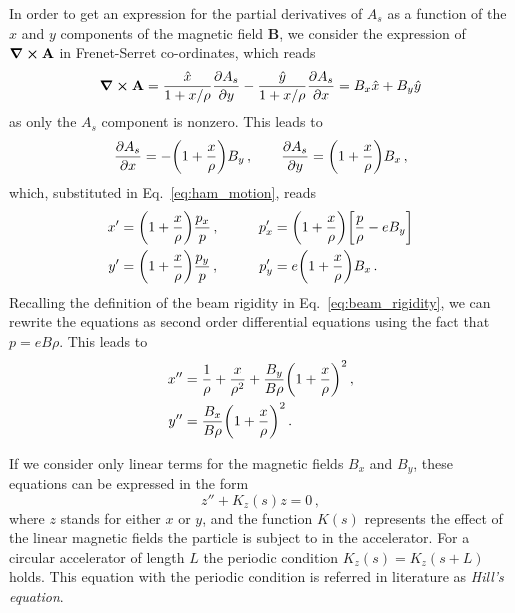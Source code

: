 In order to get an expression for the partial derivatives of $A_s$ as a function of the $x$ and $y$ components of the magnetic field $\mathbf{B}$, we consider the expression of $\curl \mathbf{A}$ in Frenet-Serret co-ordinates, which reads
%
\begin{equation}
    \curl \mathbf{A} = \frac{\hat x}{1+x/\rho}\pdv{A_s}{y} - \frac{\hat y}{1+x/\rho}\pdv{A_s}{x} = B_x\hat x + B_y\hat y %
\end{equation}
%
as only the $A_s$ component is nonzero. This leads to
%
\begin{equation}
    \pdv{A_s}{x} = -\qty(1+\frac{x}{\rho})B_y\,, \qquad \pdv{A_s}{y} = \qty(1+\frac{x}{\rho})B_x\,,
\end{equation}
%
which, substituted in Eq.~\eqref{eq:ham_motion}, reads
%
\begin{equation} 
    \begin{aligned}
        x' &= \qty(1+\frac{x}{\rho})\frac{p_x}{p}\,, &\qquad p'_x &= \qty(1+\frac{x}{\rho})\qty[ \frac{p}{\rho} - eB_y]\\
        y' &= \qty(1+\frac{x}{\rho})\frac{p_y}{p}\,, &\qquad p'_y &= e\qty(1+\frac{x}{\rho})B_x\,.
    \end{aligned}
\end{equation}
%
Recalling the definition of the beam rigidity in Eq.~\eqref{eq:beam_rigidity}, we can rewrite the equations as second order differential equations using the fact that $p=eB\rho$. This leads to
%
\begin{equation}
\begin{split}
	x'' &= \frac{1}{\rho} + \frac{x}{\rho^2} + \frac{B_y}{B\rho}\qty(1+\frac{x}{\rho})^2\,,\\
	y'' &= \frac{B_x}{B\rho}\qty(1+\frac{x}{\rho})^2\,.
\end{split}
\end{equation} 

If we consider only linear terms for the magnetic fields $B_x$ and $B_y$, these equations can be expressed in the form 
\begin{equation}
	z''+K_z(s)z = 0\, ,
\end{equation}
where $z$ stands for either $x$ or $y$, and the function $K(s)$ represents the effect of the linear magnetic fields the particle is subject to in the accelerator.  For a circular accelerator of length $L$ the periodic condition $K_z(s)=K_z(s+L)$ holds. This equation with the periodic condition is referred in literature as \textit{Hill's equation}.


